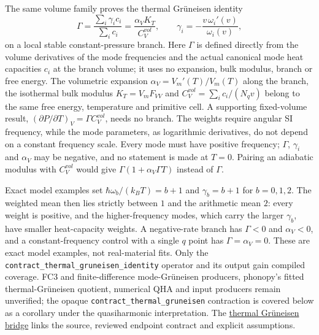 \documentclass[11pt,a4paper]{article}
\begin{document}
The same volume family proves the thermal Gr\"uneisen identity
\[
  \Gamma=\frac{\sum_i \gamma_i c_i}{\sum_i c_i}=\frac{\alpha_V K_T}{C_V^{vol}},\qquad
  \gamma_i=-\frac{v\,\omega_i'(v)}{\omega_i(v)},
\]
on a local stable constant-pressure branch. Here $\Gamma$ is defined directly
from the volume derivatives of the mode frequencies and the actual canonical mode
heat capacities $c_i$ at the branch volume; it uses no expansion, bulk modulus,
branch or free energy. The volumetric expansion $\alpha_V=V_m'(T)/V_m(T)$ along the branch, the isothermal
bulk modulus $K_T=V_m F_{VV}$ and $C_V^{vol}=\sum_i c_i/(N_q v)$ belong to the same
free energy, temperature and primitive cell. A supporting fixed-volume result,
$(\partial P/\partial T)_V=\Gamma C_V^{vol}$, needs no branch. The weights require
angular SI frequency, while the mode parameters, as logarithmic derivatives, do
not depend on a constant frequency scale. Every mode must have positive
frequency; $\Gamma$, $\gamma_i$ and $\alpha_V$ may be negative, and no statement is
made at $T=0$. Pairing an adiabatic modulus with $C_V^{vol}$ would give
$\Gamma(1+\alpha_V\Gamma T)$ instead of $\Gamma$.

Exact model examples set $\hbar\omega_b/(k_B T)=b+1$ and $\gamma_b=b+1$ for
$b=0,1,2$. The weighted mean then lies strictly between $1$ and the arithmetic mean $2$:
every weight is positive, and the higher-frequency modes, which carry the larger
$\gamma_b$, have smaller heat-capacity weights. A negative-rate
branch has $\Gamma<0$ and $\alpha_V<0$, and a constant-frequency control with a single $q$ point has
$\Gamma=\alpha_V=0$. These are exact model examples, not real-material fits. Only
the \texttt{contract\_thermal\_gruneisen\_identity} operator and its output gain
compiled coverage. FC3 and finite-difference mode-Gr\"uneisen producers,
phonopy's fitted thermal-Gr\"uneisen quotient, numerical QHA and input producers
remain unverified; the opaque \texttt{contract\_thermal\_gruneisen} contraction is
covered below as a corollary under the quasiharmonic interpretation.
The \href{https://openmaterials.ai/lean/bridge/\#gruneisen}{thermal Gr\"uneisen bridge}
links the source, reviewed endpoint contract and explicit assumptions.
\end{document}
